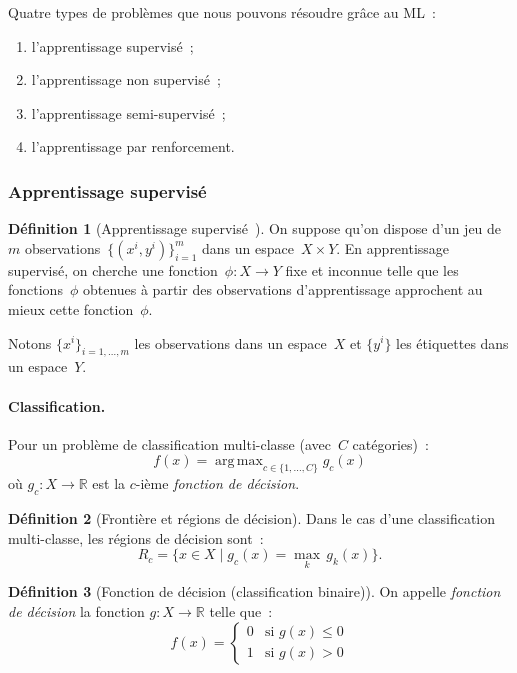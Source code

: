 \documentclass[a4paper,12pt,twoside]{report}
\theoremstyle{definition}
\newtheorem{defi}{Définition}
\theoremstyle{plain}
\theoremstyle{remark}
\newcommand{\R}{\mathbb{R}}
\DeclareMathOperator*{\argmax}{arg\,max}
\begin{document}
Quatre types de problèmes que nous pouvons résoudre grâce au \ac{ML}~:
\begin{enumerate}[label=\arabic*.]
	\item l'apprentissage supervisé~;
	\item l'apprentissage non supervisé~;
	\item l'apprentissage semi-supervisé~;
	\item l'apprentissage par renforcement.
\end{enumerate}

\subsubsection*{Apprentissage supervisé}

\begin{defi}[Apprentissage supervisé~{\cite{azencott2022ml}}]
On suppose qu'on dispose d'un jeu de~$m$ observations~$\{(x^i, y^i)\}_{i=1}^{m}$ dans un
espace~$X \times Y$. En apprentissage supervisé, on cherche une fonction~$\phi : X \to Y$
fixe et inconnue telle que les fonctions~$\phi$ obtenues à partir des observations
d'apprentissage approchent au mieux cette fonction~$\phi$.
\end{defi}

Notons $\{x^i\}_{i=1,\ldots,m}$ les observations dans un espace~$X$ et $\{y^i\}$ les
étiquettes dans un espace~$Y$.

\paragraph{Classification.}
Pour un problème de classification multi-classe (avec~$C$ catégories)~:
\[
f(x) = \argmax_{c \in \{1,\ldots,C\}} g_c(x)
\]
où $g_c : X \to \R$ est la $c$-ième \emph{fonction de décision}.

\begin{defi}[Frontière et régions de décision]
Dans le cas d'une classification multi-classe, les régions de décision sont~:
\[
R_c = \bigl\{x \in X \mid g_c(x) = \max_k\, g_k(x)\bigr\}.
\]
\end{defi}

\begin{defi}[Fonction de décision (classification binaire)]
On appelle \emph{fonction de décision} la fonction $g : X \to \R$ telle que~:
\[
f(x) =
\begin{cases}
0 & \text{si } g(x) \leq 0 \\
1 & \text{si } g(x) > 0
\end{cases}
\]
\end{defi}
\end{document}
